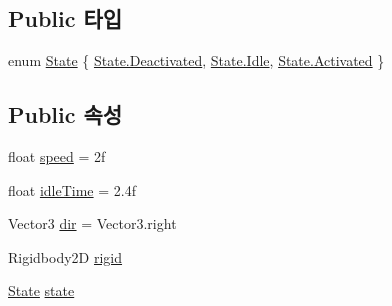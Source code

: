 \subsection*{Public 타입}
\begin{DoxyCompactItemize}
\item 
enum \mbox{\hyperlink{class_moving_platform_af3735076efde22951ec5f5fed6123acc}{State}} \{ \mbox{\hyperlink{class_moving_platform_af3735076efde22951ec5f5fed6123acca43c7582c40594c3fe32a6634ef9dcb07}{State.\+Deactivated}}, 
\mbox{\hyperlink{class_moving_platform_af3735076efde22951ec5f5fed6123accae599161956d626eda4cb0a5ffb85271c}{State.\+Idle}}, 
\mbox{\hyperlink{class_moving_platform_af3735076efde22951ec5f5fed6123accacb456215c3333db0551bd0788bc258c7}{State.\+Activated}}
 \}
\end{DoxyCompactItemize}
\subsection*{Public 속성}
\begin{DoxyCompactItemize}
\item 
float \mbox{\hyperlink{class_moving_platform_adf2e0e70bbc8733f8a4e8992ce2447da}{speed}} = 2f
\item 
float \mbox{\hyperlink{class_moving_platform_a489629e7e4703ea543f2931265d7fc2d}{idle\+Time}} = 2.\+4f
\item 
Vector3 \mbox{\hyperlink{class_moving_platform_ace8d255e601925ab820d5e64a9e62db9}{dir}} = Vector3.\+right
\item 
Rigidbody2D \mbox{\hyperlink{class_moving_platform_a724607bdb66234b3b0760c8d27cc143d}{rigid}}
\item 
\mbox{\hyperlink{class_moving_platform_af3735076efde22951ec5f5fed6123acc}{State}} \mbox{\hyperlink{class_moving_platform_a145ecedbfee379139ca60f04ecfe7d18}{state}}
\end{DoxyCompactItemize}
